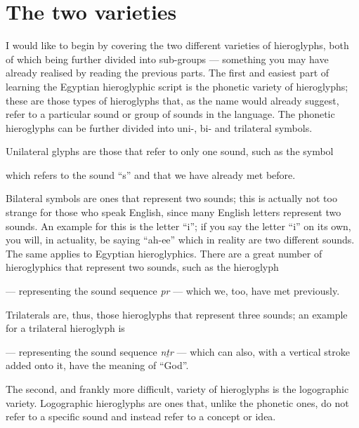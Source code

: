 \documentclass[a5paper,twoside,11pt]{report}
\begin{document}
\chapter*{The two varieties}

		I would like to begin by covering the two different varieties of hieroglyphs, both of which being further divided into sub-groups — something you may have already realised by reading the previous parts. The first and easiest part of learning the Egyptian hieroglyphic script is the phonetic variety of hieroglyphs; these are those types of hieroglyphs that, as the name would already suggest, refer to a particular sound or group of sounds in the language. The phonetic hieroglyphs can be further divided into uni-, bi- and trilateral symbols.

		Unilateral glyphs are those that refer to only one sound, such as the symbol \begin{hieroglyph}{\leavevmode {}}\end{hieroglyph} which refers to the sound “s” and that we have already met before. 
		
		Bilateral symbols are ones that represent two sounds; this is actually not too strange for those who speak English, since many English letters represent two sounds. An example for this is the letter “i”; if you say the letter “i” on its own, you will, in actuality, be saying “ah-ee” which in reality are two different sounds. The same applies to Egyptian hieroglyphics. There are a great number of hieroglyphics that represent two sounds, such as the hieroglyph \begin{hieroglyph}{\leavevmode {}}\end{hieroglyph} — representing the sound sequence \textit{pr} — which we, too, have met previously.

		Trilaterals are, thus, those hieroglyphs that represent three sounds; an example for a trilateral hieroglyph is \begin{hieroglyph}{\leavevmode {}}\end{hieroglyph} — representing the sound sequence \textit{nṯr} — which can also, with a vertical stroke added onto it, have the meaning of “God”.

		The second, and frankly more difficult, variety of hieroglyphs is the logographic variety. Logographic hieroglyphs are ones that, unlike the phonetic ones, do not refer to a specific sound and instead refer to a concept or idea. 
\end{document}
